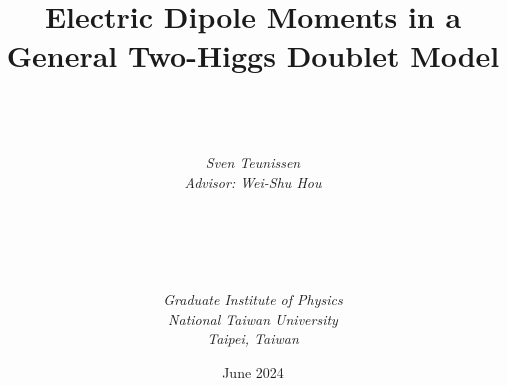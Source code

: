 \documentclass[a4paper, 12pt, twoside, openright]{mythesis}
\begin{document}
\title{\textbf{Electric Dipole Moments in a General Two-Higgs Doublet Model}}


\author{ \\  \\ \\
{\it Sven Teunissen}\\
{\it Advisor: Wei-Shu Hou} \\ \\ \\ \\  \\ \\
{\it Graduate Institute of Physics}\\
{\it National Taiwan University} \\
{\it Taipei, Taiwan}\\ }

{\date{June 2024}}

\maketitle

\frontmatter

\tableofcontents
\listoffigures
\listoftables


\mainmatter





% 



% 






\end{document}

